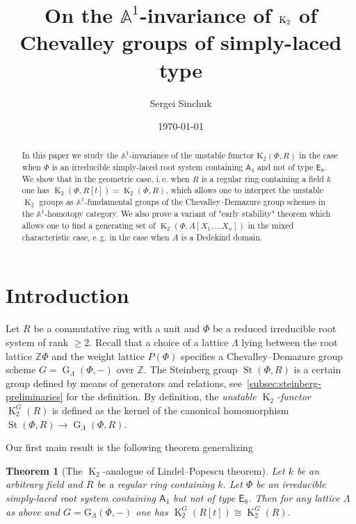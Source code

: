 \documentclass[oneside, 10pt]{amsart}
\title{On the $\mathbb{A}^1$-invariance of $\K_2$ of Chevalley groups of simply-laced type}
\author {Sergei Sinchuk}
\date {\today}
\DeclareMathOperator{\St}{St}
\DeclareMathOperator{\G}{G}
\DeclareMathOperator{\K}{K}
\newcommand{\rA}{\mathsf{A}}
\newcommand{\rE}{\mathsf{E}}
\newcommand{\ZZ}{\mathbb{Z}}
\newtheorem{thm}{Theorem}
\numberwithin{equation}{section}
\numberwithin{thm}{section}
\numberwithin{lemma}{section}
\theoremstyle{definition}
\theoremstyle{remark}
\begin{document}
    \maketitle


\begin{abstract}
In this paper we study the $\mathbb{A}^1$-invariance of the unstable functor $\mathrm{K}_2(\Phi, R)$
in the case when $\Phi$ is an irreducible simply-laced root system containing $\rA_4$ and not of type $\rE_8$.
We show that in the geometric case, i.\,e. when $R$ is a regular ring containing a field $k$
one has $\K_2(\Phi, R[t]) = \K_2(\Phi, R)$, which allows one to interpret the unstable $\K_2$ groups
as $\mathbb{A}^1$-fundamental groups of the Chevalley--Demazure group schemes in the $\mathbb{A}^1$-homotopy category.
We also prove a variant of "early stability" theorem which allows one to find a generating set
of $\K_2(\Phi, A[X_1, \ldots X_n])$ in the mixed characteristic case, e.\,g. in the case when $A$ is a Dedekind domain.
\end{abstract}

\section{Introduction}\label{sec:introduction}

Let $R$ be a commutative ring with a unit and $\Phi$ be a reduced irreducible root system of rank $\geq 2$.
Recall that a choice of a lattice $\Lambda$ lying between the root lattice $\mathbb{Z}\Phi$ and the weight lattice $P(\Phi)$
 specifies a Chevalley--Demazure group scheme $G=\G_\Lambda(\Phi, -)$ over $\ZZ$.
The Steinberg group $\St(\Phi, R)$ is a certain group defined by means of generators and relations, see~\cref{subsec:steinberg-preliminaries} for the definition.
By definition, the \textit{unstable $\K_2$-functor} $\K_2^G(R)$ is defined as the kernel of the canonical homomorphism $\St(\Phi, R) \to \G_\Lambda(\Phi, R)$.

Our first main result is the following theorem generalizing~\cite[Theorem~1.1]{LSV2}
\begin{thm}[The $\K_2$-analogue of Lindel--Popescu theorem] \label{thm:LP-for-K2}
 Let $k$ be an arbitrary field and $R$ be a regular ring containing $k$.
 Let $\Phi$ be an irreducible simply-laced root system containing $\rA_4$ but not of type $\rE_8$.
 Then for any lattice $\Lambda$ as above and $G = \mathrm{G}_\Lambda(\Phi, -)$ one has
 $\K_2^G(R[t])\cong\K_2^G(R).$
\end{thm}
\end{document}
